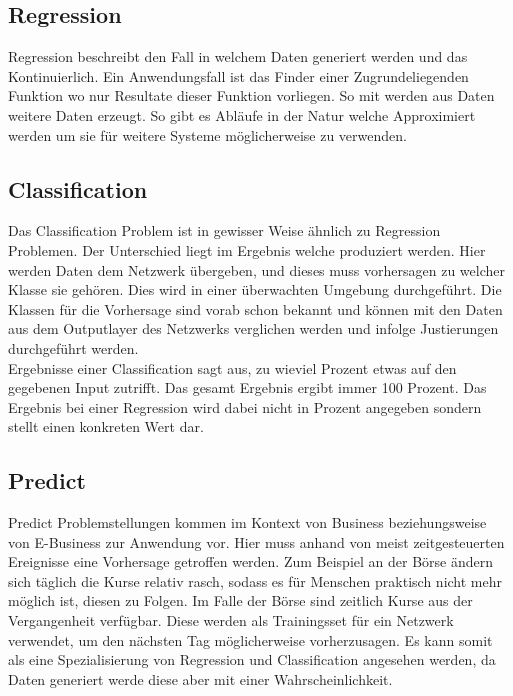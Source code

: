 \subsection{Regression}
\label{subsec:Regression}

Regression beschreibt den Fall in welchem Daten generiert werden und das Kontinuierlich.
Ein Anwendungsfall ist das Finder einer Zugrundeliegenden Funktion wo nur Resultate dieser Funktion vorliegen. 
So mit werden aus Daten weitere Daten erzeugt.
So gibt es Abläufe in der Natur welche Approximiert werden um sie für weitere Systeme möglicherweise zu verwenden. \cite{bishop2006pattern}

\subsection{Classification}
\label{subsec:Classification}

Das Classification Problem ist in gewisser Weise ähnlich zu Regression Problemen. 
Der Unterschied liegt im Ergebnis welche produziert werden.  
Hier werden Daten dem Netzwerk übergeben, und dieses muss vorhersagen zu welcher Klasse sie gehören. Dies wird in einer überwachten Umgebung durchgeführt. 
Die Klassen für die Vorhersage sind vorab schon bekannt und können mit den Daten aus dem Outputlayer des Netzwerks verglichen werden und infolge Justierungen durchgeführt werden. \cite{AI3} \\

\noindent
Ergebnisse einer Classification sagt aus, zu wieviel Prozent etwas auf den gegebenen Input zutrifft. 
Das gesamt Ergebnis ergibt immer 100 Prozent. 
Das Ergebnis bei einer Regression wird dabei nicht in Prozent angegeben sondern stellt einen konkreten Wert dar.

\subsection{Predict}
\label{subsec:Predict}

Predict Problemstellungen kommen im Kontext von Business beziehungsweise von E-Business zur Anwendung vor. 
Hier muss anhand von meist zeitgesteuerten Ereignisse eine Vorhersage getroffen werden. 
Zum Beispiel an der Börse ändern sich täglich die Kurse relativ rasch, sodass es für Menschen praktisch nicht mehr möglich ist, diesen zu Folgen. 
Im Falle der Börse sind zeitlich Kurse aus der Vergangenheit verfügbar. 
Diese werden als Trainingsset für ein Netzwerk verwendet, um den nächsten Tag möglicherweise vorherzusagen. 
Es kann somit als eine Spezialisierung von Regression und Classification angesehen werden, da Daten generiert werde diese aber mit einer Wahrscheinlichkeit.

